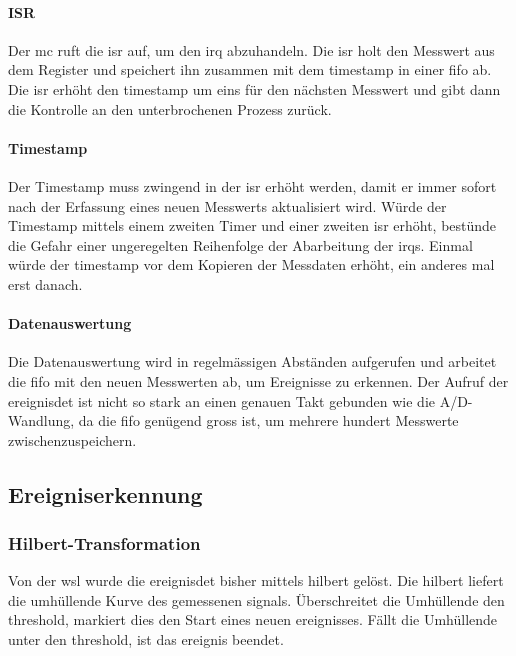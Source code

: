 \paragraph{ISR} Der \gls{mc} ruft die \gls{isr} auf, um den \gls{irq} abzuhandeln. Die \gls{isr} holt den Messwert aus dem Register und speichert ihn zusammen mit dem \gls{timestamp} in einer \gls{fifo} ab. Die \gls{isr} erhöht den \gls{timestamp} um eins für den nächsten Messwert und gibt dann die Kontrolle an den unterbrochenen Prozess zurück.

\paragraph{Timestamp} Der Timestamp muss zwingend in der \gls{isr} erhöht werden, damit er immer sofort nach der Erfassung eines neuen Messwerts aktualisiert wird. Würde der Timestamp mittels einem zweiten Timer und einer zweiten \gls{isr} erhöht, bestünde die Gefahr einer ungeregelten Reihenfolge der Abarbeitung der \gls{irq}s. Einmal würde der \gls{timestamp} vor dem Kopieren der Messdaten erhöht, ein anderes mal erst danach.

\paragraph{Datenauswertung} Die Datenauswertung wird in regelmässigen Abständen aufgerufen und arbeitet die \gls{fifo} mit den neuen Messwerten ab, um Ereignisse zu erkennen. Der Aufruf der \gls{ereignisdet} ist nicht so stark an einen genauen Takt gebunden wie die A/D-Wandlung, da die \gls{fifo} genügend gross ist, um mehrere hundert Messwerte zwischenzuspeichern.

\subsection{Ereigniserkennung}\label{subsec.sw_ereignis}
\subsubsection{Hilbert-Transformation}
Von der \gls{wsl} wurde die \gls{ereignisdet} bisher mittels \gls{hilbert} gelöst. Die \gls{hilbert} liefert die umhüllende Kurve des gemessenen \gls{signal}s. Überschreitet die Umhüllende den \gls{threshold}, markiert dies den Start eines neuen \gls{ereignis}ses. Fällt die Umhüllende unter den \gls{threshold}, ist das \gls{ereignis} beendet.

